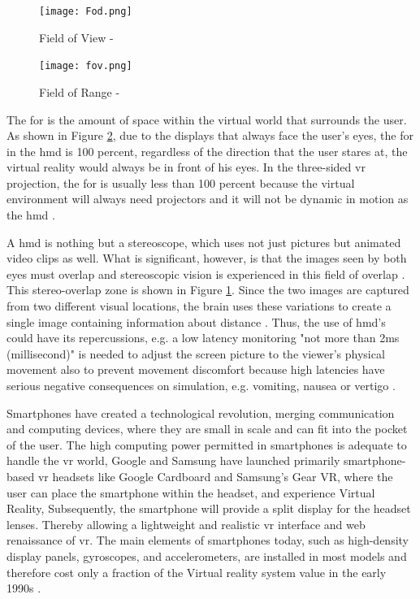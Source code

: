 \begin{figure}[ht]
    \centering
    \texttt{[image: Fod.png]}
    \caption{Field of View - \citep{William}}
    \label{fig:field}
\end{figure}


\begin{figure}[ht]
    \centering
    \texttt{[image: fov.png]}
    \caption{Field of Range - \citep{William}}
    \label{fig:fod}
\end{figure}

The \acrfull{for} is the amount of space within the virtual world that surrounds the user. As shown in Figure \ref{fig:fod}, due to the displays that always face the user's eyes, the \acrshort{for} in the \acrshort{hmd} is 100 percent, regardless of the direction that the user stares at, the virtual reality would always be in front of his eyes. In the three-sided \acrshort{vr} projection, the \acrshort{for} is usually less than 100 percent because the virtual environment will always need projectors and it will not be dynamic in motion as the \acrlong{hmd} \citep{William}.

A \acrlong{hmd} is nothing but a stereoscope, which uses not just pictures but animated video clips as well. What is significant, however, is that the images seen by both eyes must overlap and stereoscopic vision is experienced in this field of overlap \citep{Vince2011}.
This stereo-overlap zone is shown in Figure \ref{fig:field}. Since the two images are captured from two different visual locations, the brain uses these variations to create a single image containing information about distance \citep{Vince2011}. Thus, the use of \acrshort{hmd}'s could have its repercussions, e.g. a low latency monitoring "not more than 2ms (millisecond)" is needed to adjust the screen picture to the viewer's physical movement also to prevent movement discomfort because high latencies have serious negative consequences on simulation, e.g. vomiting, nausea or vertigo \citep{burdea2017virtual, Vince2011, Steinicke2016}.

Smartphones have created a technological revolution, merging communication and computing devices, where they are small in scale and can fit into the pocket of the user. The high computing power permitted in smartphones is adequate to handle the \acrshort{vr} world, Google and Samsung have launched primarily smartphone-based \acrshort{vr} headsets like Google Cardboard and Samsung's Gear VR, where the user can place the smartphone within the headset, and experience Virtual Reality, Subsequently, the smartphone will provide a split display for the headset lenses. Thereby allowing a lightweight and realistic \acrshort{vr} interface and web renaissance of \acrshort{vr}. The main elements of smartphones today, such as high-density display panels, gyroscopes, and accelerometers, are installed in most models and therefore cost only a fraction of the Virtual reality system value in the early 1990s \citep{Steinicke2016}. 



